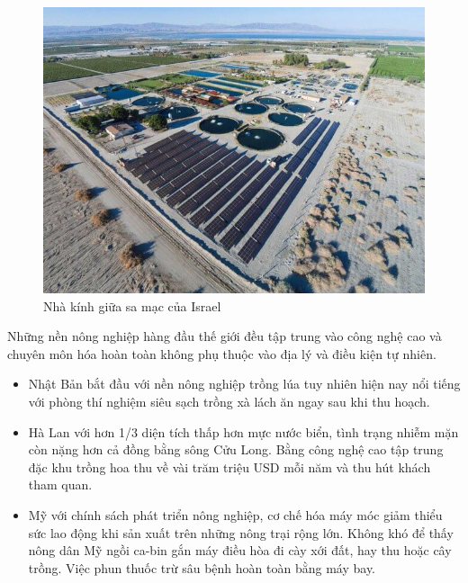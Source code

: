 \begin{figure}[H]
	\centering
	\includegraphics[scale=.6]{Chapter 1/image chapter 1/Israel.jpg}
	\caption[Nhà kính giữa sa mạc của Israel]{Nhà kính giữa sa mạc của Israel}
\end{figure}
\indent Những nền nông nghiệp hàng đầu thế giới đều tập trung vào công nghệ cao và chuyên môn hóa hoàn toàn không phụ thuộc vào địa lý và điều kiện tự nhiên. 
\begin{itemize}
	\item Nhật Bản bắt đầu với nền nông nghiệp trồng lúa tuy nhiên hiện nay nổi tiếng với phòng thí nghiệm siêu sạch trồng xà lách ăn ngay sau khi thu hoạch. 
	\item Hà Lan với hơn 1/3 diện tích thấp hơn mực nước biển, tình trạng nhiễm mặn còn nặng hơn cả đồng bằng sông Cửu Long. Bằng công nghệ cao tập trung đặc khu trồng hoa thu về vài trăm triệu USD mỗi năm và thu hút khách tham quan.
	\item Mỹ với chính sách phát triển nông nghiệp, cơ chế hóa máy móc giảm thiểu sức lao động khi sản xuất trên những nông trại rộng lớn. Không khó để thấy nông dân Mỹ ngồi ca-bin gắn máy điều hòa đi cày xới đất, hay thu hoặc cây trồng. Việc phun thuốc trừ sâu bệnh hoàn toàn bằng máy bay.
\end{itemize}
